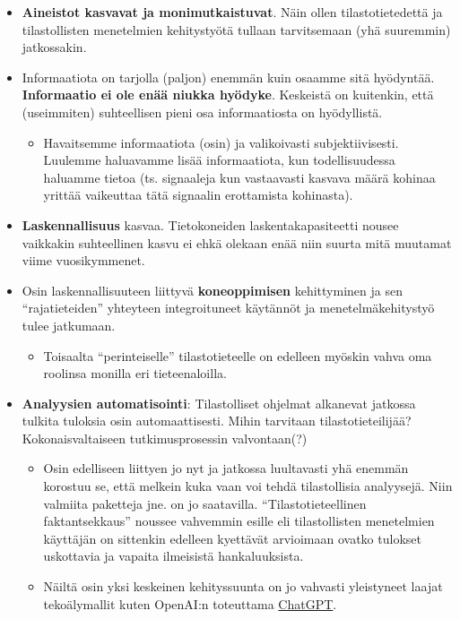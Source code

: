 \documentclass[
]{book}
\providecommand{\tightlist}{%
  \setlength{\itemsep}{0pt}\setlength{\parskip}{0pt}}
\begin{document}
\begin{itemize}
\item
  \textbf{Aineistot kasvavat ja monimutkaistuvat}. Näin ollen tilastotietedettä ja tilastollisten menetelmien kehitystyötä tullaan tarvitsemaan (yhä suuremmin) jatkossakin.
\item
  Informaatiota on tarjolla (paljon) enemmän kuin osaamme sitä hyödyntää. \textbf{Informaatio ei ole enää niukka hyödyke}. Keskeistä on kuitenkin, että (useimmiten) suhteellisen pieni osa informaatiosta on hyödyllistä.

  \begin{itemize}
  \tightlist
  \item
    Havaitsemme informaatiota (osin) ja valikoivasti subjektiivisesti. Luulemme haluavamme lisää informaatiota, kun todellisuudessa haluamme tietoa (ts. signaaleja kun vastaavasti kasvava määrä kohinaa yrittää vaikeuttaa tätä signaalin erottamista kohinasta).
  \end{itemize}
\item
  \textbf{Laskennallisuus} kasvaa. Tietokoneiden laskentakapasiteetti nousee vaikkakin suhteellinen kasvu ei ehkä olekaan enää niin suurta mitä muutamat viime vuosikymmenet.
\item
  Osin laskennallisuuteen liittyvä \textbf{koneoppimisen} kehittyminen ja sen ``rajatieteiden'' yhteyteen integroituneet käytännöt ja menetelmäkehitystyö tulee jatkumaan.

  \begin{itemize}
  \tightlist
  \item
    Toisaalta ``perinteiselle'' tilastotieteelle on edelleen myöskin vahva oma roolinsa monilla eri tieteenaloilla.
  \end{itemize}
\item
  \textbf{Analyysien automatisointi}: Tilastolliset ohjelmat alkanevat jatkossa tulkita tuloksia osin automaattisesti. Mihin tarvitaan tilastotieteilijää? Kokonaisvaltaiseen tutkimusprosessin valvontaan(?)

  \begin{itemize}
  \tightlist
  \item
    Osin edelliseen liittyen jo nyt ja jatkossa luultavasti yhä enemmän korostuu se, että melkein kuka vaan voi tehdä tilastollisia analyysejä. Niin valmiita paketteja jne. on jo saatavilla. ``Tilastotieteellinen faktantsekkaus'' noussee vahvemmin esille eli tilastollisten menetelmien käyttäjän on sittenkin edelleen kyettävät arvioimaan ovatko tulokset uskottavia ja vapaita ilmeisistä hankaluuksista.
  \item
    Näiltä osin yksi keskeinen kehityssuunta on jo vahvasti yleistyneet laajat tekoälymallit kuten OpenAI:n toteuttama \href{https://chat.openai.com/}{ChatGPT}.


\end{itemize}
\end{itemize}
\end{document}
